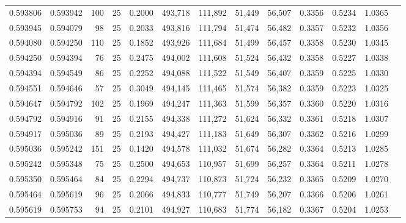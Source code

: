 \begin{tabular}{rrrrrrrrrrrrr}
0.593806 & 0.593942 &   100 &  25 &                                     0.2000 & 493,718 & 111,892 &  51,449 &  56,507 & 0.3356 & 0.5234 & 1.0365 \\
0.593945 & 0.594079 &    98 &  25 &                                     0.2033 & 493,816 & 111,794 &  51,474 &  56,482 & 0.3357 & 0.5232 & 1.0356 \\
0.594080 & 0.594250 &   110 &  25 &                                     0.1852 & 493,926 & 111,684 &  51,499 &  56,457 & 0.3358 & 0.5230 & 1.0345 \\
0.594250 & 0.594394 &    76 &  25 &                                     0.2475 & 494,002 & 111,608 &  51,524 &  56,432 & 0.3358 & 0.5227 & 1.0338 \\
0.594394 & 0.594549 &    86 &  25 &                                     0.2252 & 494,088 & 111,522 &  51,549 &  56,407 & 0.3359 & 0.5225 & 1.0330 \\
0.594551 & 0.594646 &    57 &  25 &                                     0.3049 & 494,145 & 111,465 &  51,574 &  56,382 & 0.3359 & 0.5223 & 1.0325 \\
0.594647 & 0.594792 &   102 &  25 &                                     0.1969 & 494,247 & 111,363 &  51,599 &  56,357 & 0.3360 & 0.5220 & 1.0316 \\
0.594792 & 0.594916 &    91 &  25 &                                     0.2155 & 494,338 & 111,272 &  51,624 &  56,332 & 0.3361 & 0.5218 & 1.0307 \\
0.594917 & 0.595036 &    89 &  25 &                                     0.2193 & 494,427 & 111,183 &  51,649 &  56,307 & 0.3362 & 0.5216 & 1.0299 \\
0.595036 & 0.595242 &   151 &  25 &                                     0.1420 & 494,578 & 111,032 &  51,674 &  56,282 & 0.3364 & 0.5213 & 1.0285 \\
0.595242 & 0.595348 &    75 &  25 &                                     0.2500 & 494,653 & 110,957 &  51,699 &  56,257 & 0.3364 & 0.5211 & 1.0278 \\
0.595350 & 0.595464 &    84 &  25 &                                     0.2294 & 494,737 & 110,873 &  51,724 &  56,232 & 0.3365 & 0.5209 & 1.0270 \\
0.595464 & 0.595619 &    96 &  25 &                                     0.2066 & 494,833 & 110,777 &  51,749 &  56,207 & 0.3366 & 0.5206 & 1.0261 \\
0.595619 & 0.595753 &    94 &  25 &                                     0.2101 & 494,927 & 110,683 &  51,774 &  56,182 & 0.3367 & 0.5204 & 1.0253 \\

\end{tabular}
